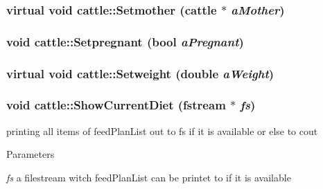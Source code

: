 \label{classcattle_aeed22677fe5975db88ee1788b5d27670}
\hypertarget{classcattle_ad80178c5a27de60a10542207d47ec2c2}{
\subsubsection[{Setmother}]{\setlength{\rightskip}{0pt plus 5cm}virtual void cattle::Setmother ({\bf cattle} $\ast$ {\em aMother})}}
\label{classcattle_ad80178c5a27de60a10542207d47ec2c2}
\hypertarget{classcattle_ad253d77a1a672d0ebc2b4e7093aad228}{
\subsubsection[{Setpregnant}]{\setlength{\rightskip}{0pt plus 5cm}void cattle::Setpregnant (bool {\em aPregnant})}}
\label{classcattle_ad253d77a1a672d0ebc2b4e7093aad228}
\hypertarget{classcattle_a89311923c18e5e7abbd67339f150a077}{
\subsubsection[{Setweight}]{\setlength{\rightskip}{0pt plus 5cm}virtual void cattle::Setweight (double {\em aWeight})}}
\label{classcattle_a89311923c18e5e7abbd67339f150a077}
\hypertarget{classcattle_ac747b39751d40739d2b1c00246e65c7d}{
\subsubsection[{ShowCurrentDiet}]{\setlength{\rightskip}{0pt plus 5cm}void cattle::ShowCurrentDiet (fstream $\ast$ {\em fs})}}
\label{classcattle_ac747b39751d40739d2b1c00246e65c7d}
printing all items of feedPlanList out to fs if it is available or else to cout 
\begin{DoxyParams}{Parameters}
\item[{\em fs}]a filestream witch feedPlanList can be printet to if it is available\end{DoxyParams}
